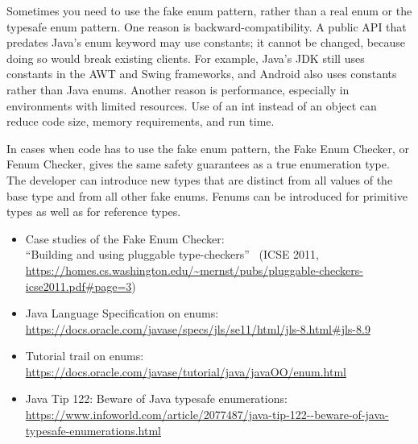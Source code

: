 Sometimes you need to use the fake enum pattern,
rather than a real enum or the typesafe enum pattern.
%
One reason is backward-compatibility.  A public API that predates Java's
enum keyword may use  constants; it cannot be changed, because
doing so would break existing clients.  For example, Java's JDK still uses
 constants in the AWT and Swing frameworks, and Android also uses
 constants rather than Java enums.
%
Another reason is performance, especially in environments with limited
resources.  Use of an int instead of an object can
reduce code size, memory requirements, and run time.

In cases when code has to use the fake enum pattern, the Fake Enum Checker,
or Fenum Checker, gives the same safety guarantees as a true enumeration type.
The developer can introduce new types that are distinct from all values of the
base type and from all other fake enums. Fenums can be introduced for
primitive types as well as for reference types.



\begin{itemize}
\item Case studies of the Fake Enum Checker:\\
  ``Building and using pluggable type-checkers''~\cite{DietlDEMS2011}
  (ICSE 2011, \url{https://homes.cs.washington.edu/~mernst/pubs/pluggable-checkers-icse2011.pdf#page=3})

\item Java Language Specification on enums:\\
  \url{https://docs.oracle.com/javase/specs/jls/se11/html/jls-8.html#jls-8.9}

\item Tutorial trail on enums:\\
  \url{https://docs.oracle.com/javase/tutorial/java/javaOO/enum.html}

\item Java Tip 122: Beware of Java typesafe enumerations:\\
  \url{https://www.infoworld.com/article/2077487/java-tip-122--beware-of-java-typesafe-enumerations.html}

\end{itemize}

